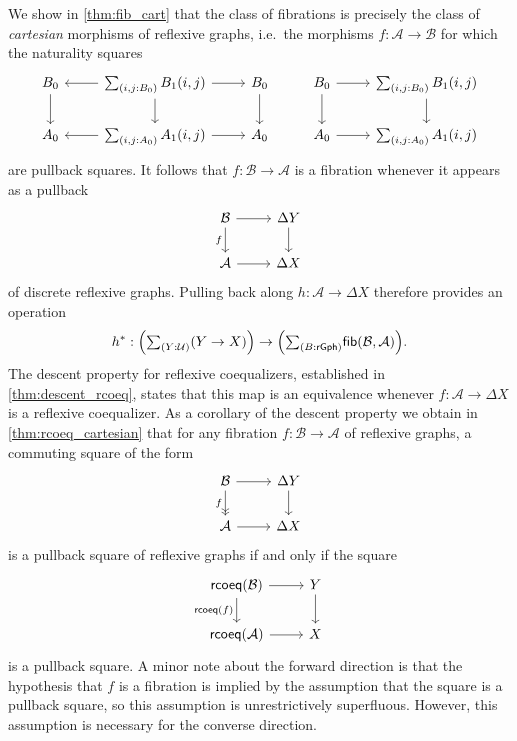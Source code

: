 We show in \cref{thm:fib_cart} that the class of fibrations is precisely the class of \emph{cartesian} morphisms of reflexive graphs, i.e.~the morphisms $f:\mathcal{A}\to\mathcal{B}$ for which the naturality squares
\begin{equation*}
\begin{tikzcd}
\pts{B} \arrow[d] & \sm{i,j:\pts{B}}\edg{B}(i,j) \arrow[d] \arrow[r] \arrow[l] & \pts{B} \arrow[d] & \pts{B} \arrow[r] \arrow[d] & \sm{i,j:\pts{B}}\edg{B}(i,j) \arrow[d] \\
\pts{A} & \sm{i,j:\pts{A}}\edg{A}(i,j) \arrow[l] \arrow[r] & \pts{A} & \pts{A} \arrow[r] & \sm{i,j:\pts{A}}\edg{A}(i,j)
\end{tikzcd}
\end{equation*}
are pullback squares. It follows that $f:\mathcal{B}\to\mathcal{A}$ is a fibration whenever it appears as a pullback
\begin{equation*}
\begin{tikzcd}
\mathcal{B} \arrow[d,swap,"f"] \arrow[r] & \Delta Y \arrow[d] \\
\mathcal{A} \arrow[r] & \Delta X
\end{tikzcd}
\end{equation*}
of discrete reflexive graphs. Pulling back along $h:\mathcal{A}\to\Delta X$ therefore provides an operation
\begin{equation*}
h^\ast : \Big(\sm{Y:\UU}(Y\to X)\Big)\to \Big(\sm{B:\mathsf{rGph}}\mathsf{fib}(\mathcal{B},\mathcal{A})\Big).
\end{equation*}
The descent property for reflexive coequalizers, established in \cref{thm:descent_rcoeq}, states that this map is an equivalence whenever $f:\mathcal{A}\to\Delta X$ is a reflexive coequalizer. As a corollary of the descent property we obtain in \cref{thm:rcoeq_cartesian} that for any fibration $f:\mathcal{B}\to\mathcal{A}$ of reflexive graphs, a commuting square of the form
\begin{equation*}
\begin{tikzcd}
\mathcal{B} \arrow[d,->>,swap,"f"] \arrow[r] & \Delta Y \arrow[d] \\
\mathcal{A} \arrow[r] & \Delta X
\end{tikzcd}
\end{equation*}
is a pullback square of reflexive graphs if and only if the square
\begin{equation*}
\begin{tikzcd}
\mathsf{rcoeq}(\mathcal{B}) \arrow[d,swap,"\mathsf{rcoeq}(f)"] \arrow[r] & Y \arrow[d] \\
\mathsf{rcoeq}(\mathcal{A}) \arrow[r] & X
\end{tikzcd}
\end{equation*}
is a pullback square. A minor note about the forward direction is that the hypothesis that $f$ is a fibration is implied by the assumption that the square is a pullback square, so this assumption is unrestrictively superfluous. However, this assumption is necessary for the converse direction.

